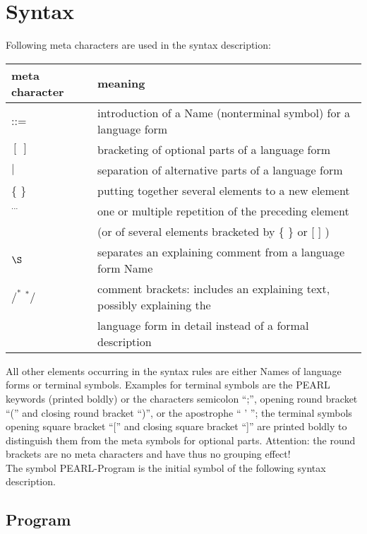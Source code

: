 \newpage
\section{Syntax}    %

Following meta characters are used in the syntax description:\\ 

\begin{tabular}{ll}
meta character & meaning \\ \hline
::=            & introduction of a Name (nonterminal symbol) for a language form\\
$[\ ]$         & bracketing of optional parts of a language form \\ 
$\mid$         & separation of alternative parts of a language form\\
\{ \}          & putting together several elements to a new element\\
$^{...}$       & one or multiple repetition of the preceding element\\
               & (or of several elements bracketed by \{ \} or [ ] ) \\
$\S $          & separates an explaining comment from a language form Name\\
$/^*$ $^*/$    & comment brackets: 
                 includes an explaining text, possibly explaining the\\
               & language form in detail instead of a formal description\\
\end{tabular}

All other elements occurring in the syntax rules are either Names of language
forms or terminal symbols. Examples for terminal symbols are the PEARL
keywords (printed boldly) or the characters semicolon ``;'', opening round
bracket ``('' and closing round bracket ``)'', 
or the apostrophe `` ' ''; the terminal symbols opening square bracket ``[''
and closing square bracket ``]'' are printed boldly to distinguish them
from the meta symbols for optional parts. Attention: the round brackets are
no meta characters and have thus no grouping effect!\\

The symbol PEARL-Program is the initial symbol of the following syntax
description.

\subsection{Program}    %

